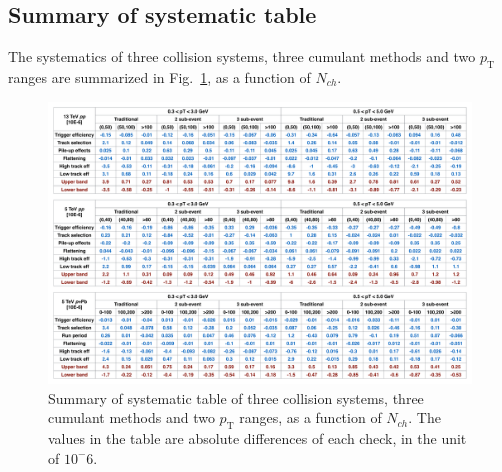 \subsection{Summary of systematic table}
The systematics of three collision systems, three cumulant methods and two $p_{\text{T}}$ ranges are summarized in Fig.~\ref{fig:systematic_table}, as a function of $N_{ch}$.
\begin{figure}[H]
\centering
\includegraphics[width=1.\linewidth]{figs/sec_sys/systematic_table.pdf}
\caption{Summary of systematic table of three collision systems, three cumulant methods and two $p_{\text{T}}$ ranges, as a function of $N_{ch}$. The values in the table are absolute differences of each check, in the unit of $10^-6$.}
\label{fig:systematic_table}
\end{figure}



